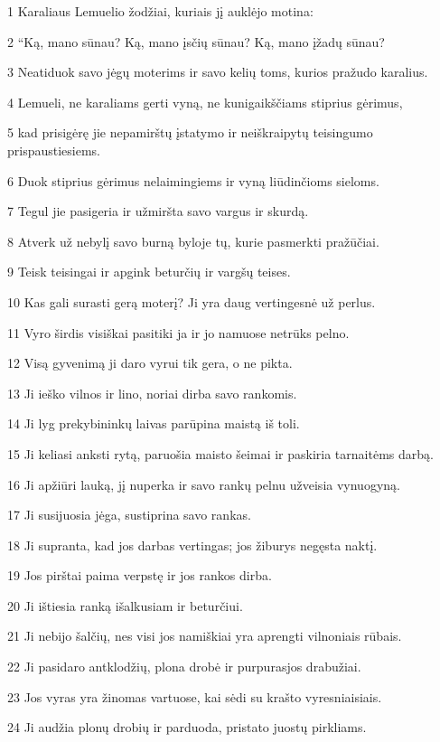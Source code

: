 \par 1 Karaliaus Lemuelio žodžiai, kuriais jį auklėjo motina: 
\par 2 “Ką, mano sūnau? Ką, mano įsčių sūnau? Ką, mano įžadų sūnau? 
\par 3 Neatiduok savo jėgų moterims ir savo kelių toms, kurios pražudo karalius. 
\par 4 Lemueli, ne karaliams gerti vyną, ne kunigaikščiams stiprius gėrimus, 
\par 5 kad prisigėrę jie nepamirštų įstatymo ir neiškraipytų teisingumo prispaustiesiems. 
\par 6 Duok stiprius gėrimus nelaimingiems ir vyną liūdinčioms sieloms. 
\par 7 Tegul jie pasigeria ir užmiršta savo vargus ir skurdą. 
\par 8 Atverk už nebylį savo burną byloje tų, kurie pasmerkti pražūčiai. 
\par 9 Teisk teisingai ir apgink beturčių ir vargšų teises. 
\par 10 Kas gali surasti gerą moterį? Ji yra daug vertingesnė už perlus. 
\par 11 Vyro širdis visiškai pasitiki ja ir jo namuose netrūks pelno. 
\par 12 Visą gyvenimą ji daro vyrui tik gera, o ne pikta. 
\par 13 Ji ieško vilnos ir lino, noriai dirba savo rankomis. 
\par 14 Ji lyg prekybininkų laivas parūpina maistą iš toli. 
\par 15 Ji keliasi anksti rytą, paruošia maisto šeimai ir paskiria tarnaitėms darbą. 
\par 16 Ji apžiūri lauką, jį nuperka ir savo rankų pelnu užveisia vynuogyną. 
\par 17 Ji susijuosia jėga, sustiprina savo rankas. 
\par 18 Ji supranta, kad jos darbas vertingas; jos žiburys negęsta naktį. 
\par 19 Jos pirštai paima verpstę ir jos rankos dirba. 
\par 20 Ji ištiesia ranką išalkusiam ir beturčiui. 
\par 21 Ji nebijo šalčių, nes visi jos namiškiai yra aprengti vilnoniais rūbais. 
\par 22 Ji pasidaro antklodžių, plona drobė ir purpuras­jos drabužiai. 
\par 23 Jos vyras yra žinomas vartuose, kai sėdi su krašto vyresniaisiais. 
\par 24 Ji audžia plonų drobių ir parduoda, pristato juostų pirkliams. 
